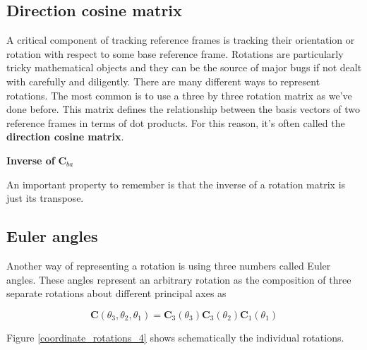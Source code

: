 
\subsection{Direction cosine matrix}
\label{direction_cosine_matrix}

A critical component of tracking
reference frames is tracking their orientation or rotation with
respect to some base reference frame. Rotations are particularly tricky
mathematical objects and they can be the source of major bugs if not
dealt with carefully and diligently. There are many different ways
to represent rotations. The most common is to use a three by three rotation matrix
as we've done before. This matrix defines
the relationship between the basis vectors of two reference
frames in terms of dot products. For this reason, it's often called
the \textbf{direction cosine matrix}.


\begin{framed}
\theoremstyle{remark}
\begin{remark}{\textbf{Inverse of} $\mathbf{C}_{ba}$}

An important property to
remember is that the inverse of a rotation matrix
is just its transpose.
\end{remark}
\end{framed}

\subsection{Euler angles}
\label{euler_angles}

Another way of representing a rotation is using three numbers
called Euler angles. These angles represent an arbitrary
rotation as the composition of three separate rotations about
different principal axes as 

\begin{equation}
\mathbf{C}(\theta_3, \theta_2, \theta_1) = \mathbf{C}_3(\theta_3)\mathbf{C}_3(\theta_2)\mathbf{C}_1(\theta_1) 
\end{equation}


Figure \ref{coordinate_rotations_4} shows schematically the individual rotations. 

